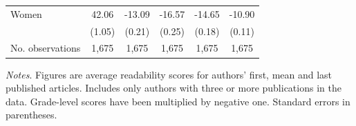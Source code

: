 \begin{table}[H]
\begin{threeparttable}
\begin{tabular}{p{3cm}S@{}S@{}S@{}S@{}S@{}}
            \quad Women                   &       42.06&      -13.09&      -16.57&      -14.65&      -10.90\\
                                          &      {(1.05)}&      {(0.21)}&      {(0.25)}&      {(0.18)}&      {(0.11)}\\
            \midrule
            No. observations              &       1,675&       1,675&       1,675&       1,675&       1,675\\
            \bottomrule
        \end{tabular}
        \begin{tablenotes}
            \tiny
            \item \textit{Notes}. Figures are average readability scores for authors' first, mean and last published articles. Includes only authors with three or more publications in the data. Grade-level scores have been multiplied by negative one. Standard errors in parentheses.
        \end{tablenotes}
    \end{threeparttable}
\end{table}